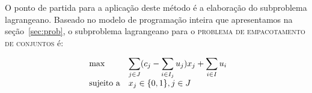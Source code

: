 \documentclass{article}
\begin{document}
	O ponto de partida para a aplicação deste método é a elaboração do subproblema lagrangeano. Baseado no modelo de programação inteira que apresentamos na seção~\ref{sec:prob}, o subproblema lagrangeano para o \textsc{problema de empacotamento de conjuntos} é: 
	
	\begin{equation*}
        \begin{array}{ll@{}ll}
            \text{max}  & \displaystyle\sum\limits_{j \in J} (c_{j} - \displaystyle\sum\limits_{i \in I_j} u_{j})x_j+  \displaystyle\sum\limits_{i \in I} u_{i}\\
            \text{sujeito a}
                 &                                                x_{j} \in \{0,1\}, j \in J
        \end{array}
    \end{equation*}
	
	 
	
\end{document}
